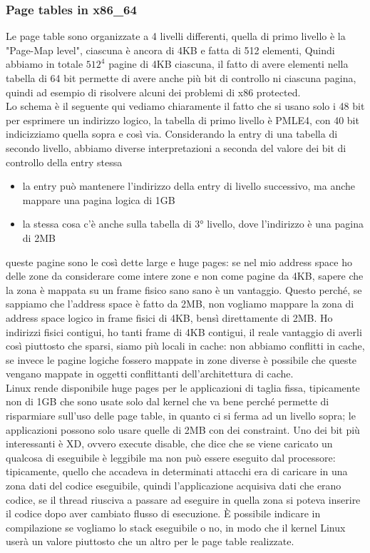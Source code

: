 \documentclass[12pt, oneside]{extbook}
\begin{document}
\subsubsection{Page tables in x86\_64}
Le page table sono organizzate a 4 livelli differenti, quella di primo livello è la "Page-Map level", ciascuna è ancora di 4KB e fatta di 512 elementi, Quindi abbiamo in totale $512^4$ pagine di 4KB ciascuna, il fatto di avere elementi nella tabella di 64 bit permette di avere anche più bit di controllo ni ciascuna pagina, quindi ad esempio di risolvere alcuni dei problemi di x86 protected.\\ Lo schema è il seguente
qui vediamo chiaramente il fatto che si usano solo i 48 bit per esprimere un indirizzo logico, la tabella di primo livello è PMLE4, con 40 bit indicizziamo quella sopra e così via. Considerando la entry di una tabella di secondo livello, abbiamo diverse interpretazioni a seconda del valore dei bit di controllo della entry stessa
\begin{itemize}
\item la entry può mantenere l'indirizzo della entry di livello successivo, ma anche mappare una pagina logica di 1GB
\item la stessa cosa c'è anche sulla tabella di 3° livello, dove l'indirizzo è una pagina di 2MB
\end{itemize}
queste pagine sono le così dette large e huge pages: se nel mio address space ho delle zone da considerare come intere zone e non come pagine da 4KB, sapere che la zona è mappata su un frame fisico sano sano è un vantaggio. Questo perché, se sappiamo che l'address space è fatto da 2MB, non vogliamo mappare la zona di address space logico in frame fisici di 4KB, bensì direttamente di 2MB. Ho indirizzi fisici contigui, ho tanti frame di 4KB contigui, il reale vantaggio di averli così piuttosto che sparsi, siamo più locali in cache: non abbiamo conflitti in cache, se invece le pagine logiche fossero mappate in zone diverse è possibile che queste vengano mappate in oggetti conflittanti dell'architettura di cache.\\ Linux rende disponibile huge pages per le applicazioni di taglia fissa, tipicamente non di 1GB che sono usate solo dal kernel che va bene perché permette di risparmiare sull'uso delle page table, in quanto ci si ferma ad un livello sopra; le applicazioni possono solo usare quelle di 2MB con dei constraint. Uno dei bit più interessanti è XD, ovvero execute disable, che dice che se viene caricato un qualcosa di eseguibile è leggibile ma non può essere eseguito dal processore: tipicamente, quello che accadeva in determinati attacchi era di caricare in una zona dati del codice eseguibile, quindi l'applicazione acquisiva dati che erano codice, se il thread riusciva a passare ad eseguire in quella zona si poteva inserire il codice dopo aver cambiato flusso di esecuzione. È possibile indicare in compilazione se vogliamo lo stack eseguibile o no, in modo che il kernel Linux userà un valore piuttosto che un altro per le page table realizzate.
\end{document}

